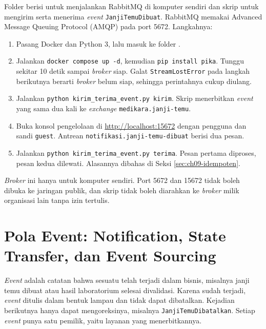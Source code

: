 \begin{pendalaman}[title={Pendalaman Teknis (opsional): Menjalankan Broker Lokal}]
  Folder  berisi  untuk
  menjalankan RabbitMQ di komputer sendiri dan skrip  untuk mengirim
  serta menerima \textit{event} \texttt{JanjiTemuDibuat}. RabbitMQ memakai Advanced Message Queuing
  Protocol (AMQP) pada port 5672. Langkahnya:
  \begin{enumerate}
    \item Pasang Docker dan Python 3, lalu masuk ke folder
          .
    \item Jalankan \texttt{docker compose up -d}, kemudian \texttt{pip install pika}. Tunggu sekitar
          10 detik sampai \textit{broker} siap. Galat \texttt{StreamLostError} pada langkah berikutnya
          berarti \textit{broker} belum siap, sehingga perintahnya cukup diulang.
    \item Jalankan \texttt{python kirim\_terima\_event.py kirim}. Skrip menerbitkan \textit{event}
          yang sama dua kali ke \textit{exchange} \texttt{medikara.janji-temu}.
    \item Buka konsol pengelolaan di \url{http://localhost:15672} dengan pengguna dan sandi
          \texttt{guest}. Antrean \texttt{notifikasi.janji-temu-dibuat} berisi dua pesan.
    \item Jalankan \texttt{python kirim\_terima\_event.py terima}. Pesan pertama diproses, pesan
          kedua dilewati. Alasannya dibahas di Seksi \ref{sec:ch09-idempoten}.
  \end{enumerate}
  \textit{Broker} ini hanya untuk komputer sendiri. Port 5672 dan 15672 tidak boleh dibuka ke
  jaringan publik, dan skrip tidak boleh diarahkan ke \textit{broker} milik organisasi lain tanpa
  izin tertulis.
\end{pendalaman}

\section{Pola Event: Notification, State Transfer, dan Event Sourcing}
\label{sec:ch09-pola-event}

\textit{Event} adalah catatan bahwa sesuatu telah terjadi dalam bisnis, misalnya janji temu dibuat
atau hasil laboratorium selesai divalidasi. Karena sudah terjadi, \textit{event} ditulis dalam
bentuk lampau dan tidak dapat dibatalkan. Kejadian berikutnya hanya dapat mengoreksinya, misalnya
\texttt{JanjiTemuDibatalkan}. Setiap \textit{event} punya satu pemilik, yaitu layanan yang
menerbitkannya.

